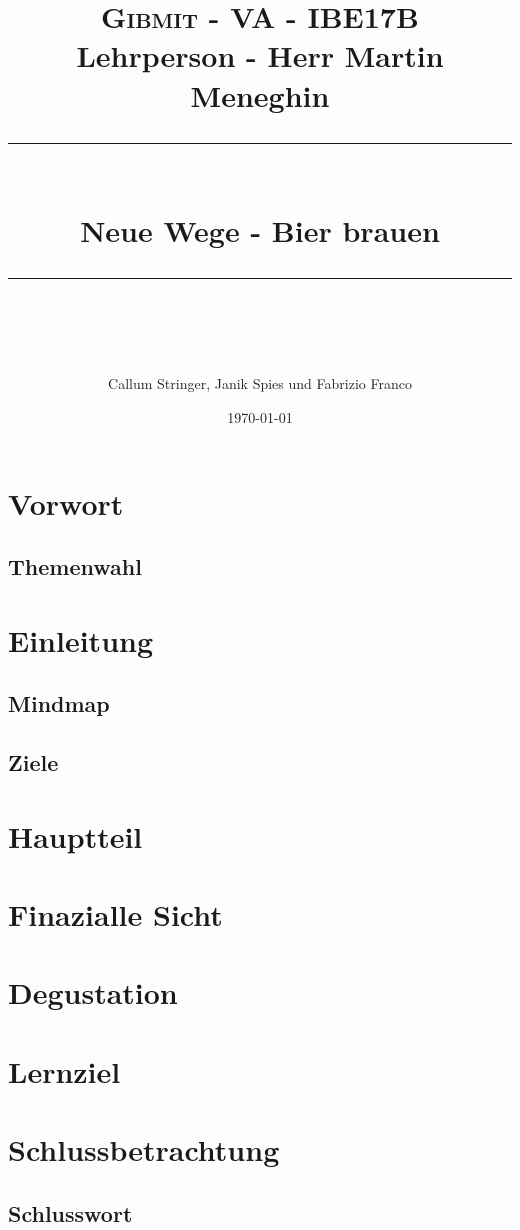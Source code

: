 \documentclass[12pt]{scrartcl}
\title{	
	\normalfont\small
	\textsc{Gibmit - VA - IBE17B}\\ 
	{Lehrperson - Herr Martin Meneghin}
	\vspace{25pt} 
	\rule{\linewidth}{0.5pt}\\
	\vspace{16pt} 
	{\huge Neue Wege - Bier brauen}\\ 
	\vspace{10pt} 
	\rule{\linewidth}{2pt}\\ 
	\author{\large Callum Stringer, Janik Spies und Fabrizio Franco} 
	\vspace{12pt} 
	\date{\small\today} 
}
\begin{document}
\maketitle
\thispagestyle{empty}
\newpage
\tableofcontents

\section{Vorwort}
\subsection{Themenwahl}

\newpage
\section{Einleitung}

\subsection{Mindmap}


\subsection{Ziele} \label{introduction}

\section{Hauptteil}
\section{Finazialle Sicht}
\section{Degustation}


\section{Lernziel}

\section{Schlussbetrachtung}
\subsection{Schlusswort}


\nocite{*}
\printbibliography[title={Quellenverzeichnis}]
\end{document}
